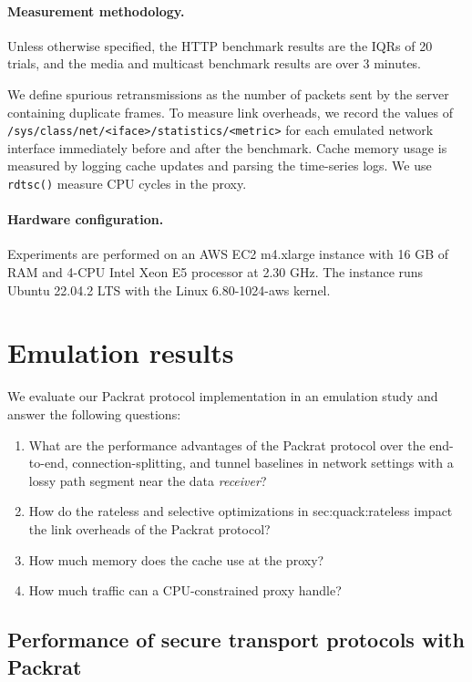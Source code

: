 \paragraph{Measurement methodology.}

Unless otherwise specified, the HTTP benchmark results are the IQRs of
20 trials, and the media and multicast benchmark results are over 3 minutes.

We define spurious retransmissions as the number of packets sent by the server
containing duplicate frames. To measure link overheads, we record the values
of \texttt{/sys/class/net/<iface>/statistics/<metric>} for each emulated
network interface immediately before and after the benchmark. Cache memory
usage is measured by logging cache updates and parsing the time-series logs. We
use \texttt{rdtsc()} measure CPU cycles in the proxy.

\paragraph{Hardware configuration.}

Experiments are performed on an AWS EC2 m4.xlarge instance with 16 GB of RAM
and 4-CPU Intel Xeon E5 processor at 2.30 GHz. The instance
runs Ubuntu 22.04.2 LTS with the Linux 6.80-1024-aws kernel.

\section{Emulation results}
\label{sec:packrat:evaluation}

We evaluate our Packrat protocol implementation in an emulation study and answer
the following questions:
\begin{enumerate}[noitemsep]
    \item What are the performance advantages of the Packrat protocol over the
     end-to-end, connection-splitting, and tunnel baselines in network settings
     with a lossy path segment near the data \textit{receiver}?
    \item How do the rateless and selective optimizations in \Cref
     {sec:quack:rateless} impact the link overheads of the Packrat protocol?
    \item How much memory does the cache use at the proxy?
    \item How much traffic can a CPU-constrained proxy handle?
\end{enumerate}

\subsection{Performance of secure transport protocols with Packrat}
\label{sec:packrat:evaluation:main-results}

